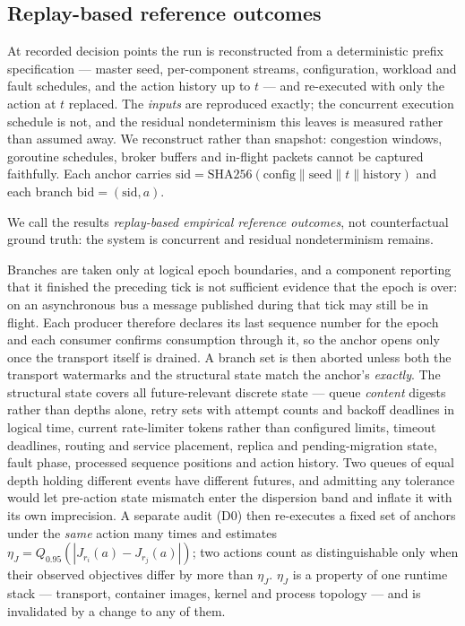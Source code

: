\documentclass[journal]{IEEEtran}
\begin{document}
\subsection{Replay-based reference outcomes}
At recorded decision points the run is reconstructed from a deterministic
prefix specification --- master seed, per-component streams, configuration,
workload and fault schedules, and the action history up to $t$ --- and
re-executed with only the action at $t$ replaced. The \emph{inputs} are
reproduced exactly; the concurrent execution schedule is not, and the residual
nondeterminism this leaves is measured rather than assumed away. We reconstruct rather than snapshot: congestion
windows, goroutine schedules, broker buffers and in-flight packets cannot be
captured faithfully. Each anchor carries
$\mathrm{sid}=\mathrm{SHA256}(\text{config}\|\text{seed}\|t\|\text{history})$
and each branch $\mathrm{bid}=(\mathrm{sid},a)$.

We call the results \emph{replay-based empirical reference outcomes}, not
counterfactual ground truth: the system is concurrent and residual
nondeterminism remains.

Branches are taken only at logical epoch boundaries, and a component reporting
that it finished the preceding tick is not sufficient evidence that the epoch is
over: on an asynchronous bus a message published during that tick may still be
in flight. Each producer therefore declares its last sequence number for the
epoch and each consumer confirms consumption through it, so the anchor opens
only once the transport itself is drained. A branch set is then aborted unless
both the transport watermarks and the structural state match the anchor's
\emph{exactly}. The structural state covers all future-relevant discrete state
--- queue \emph{content} digests rather than depths alone, retry sets with
attempt counts and backoff deadlines in logical time, current rate-limiter
tokens rather than configured limits, timeout deadlines, routing and service
placement, replica and pending-migration state, fault phase, processed sequence
positions and action history. Two queues of equal depth holding different events
have different futures, and admitting any tolerance would let pre-action state
mismatch enter the dispersion band and inflate it with its own imprecision. A separate audit (D0) then re-executes a fixed set
of anchors under the \emph{same} action many times and estimates
$\eta_J=Q_{0.95}(|J_{r_i}(a)-J_{r_j}(a)|)$; two actions count as
distinguishable only when their observed objectives differ by more than
$\eta_J$. $\eta_J$ is a property of one runtime stack --- transport, container
images, kernel and process topology --- and is invalidated by a change to any of
them.
\end{document}
